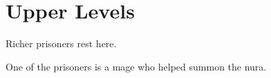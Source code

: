 \section{Upper Levels}

\begin{multicols}{2}


Richer prisoners rest here.

One of the prisoners is a mage who helped summon the nura.

\humandiplomat


\umberhulk

\end{multicols}

